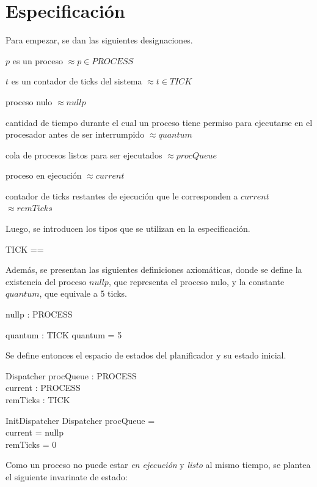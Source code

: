 \documentclass{article}
\newcommand{\desig}[2]{\item #1 $\approx #2$}
\newenvironment{designations}
  {\begin{leftbar}
    \begin{list}{}{\setlength{\labelsep}{0cm}
                   \setlength{\labelwidth}{0cm}
                   \setlength{\listparindent}{0cm}
                   \setlength{\rightmargin}{\leftmargin}}}
  {\end{list}\end{leftbar}}
\begin{document}
\section{Especificación}
Para empezar, se dan las siguientes designaciones.

\begin{designations}
\desig{$p$ es un proceso}{p \in PROCESS}
\desig{$t$ es un contador de ticks del sistema}{t \in TICK}
\desig{proceso nulo}{nullp}
\desig{cantidad de tiempo durante el cual un proceso tiene permiso para ejecutarse en el procesador antes de ser interrumpido}{quantum}
\desig{cola de procesos listos para ser ejecutados}{procQueue}
\desig{proceso en ejecución}{current}
\desig{contador de ticks restantes de ejecución que le corresponden a $current$}{remTicks}
\end{designations}

Luego, se introducen los tipos que se utilizan en la especificaci\'on. 

\begin{zed}
    [PROCESS]
\also
    TICK == \nat
\end{zed}

Adem\'as, se presentan las siguientes definiciones axiom\'aticas, donde se define la existencia del proceso $nullp$, que representa el proceso nulo, y la constante $quantum$, que equivale a 5 ticks.

\begin{axdef}
    nullp : PROCESS
\end{axdef}

\begin{axdef}
    quantum : TICK
\where
    quantum = 5
\end{axdef}

Se define entonces el espacio de estados del planificador y su estado inicial.

\begin{schema}{Dispatcher}
    procQueue : \seq \langle PROCESS \rangle \\
    current : PROCESS \\
    remTicks : TICK
\end{schema}

\begin{schema}{InitDispatcher}
    Dispatcher
\where
    procQueue = \langle \rangle \\
    current = nullp \\
    remTicks = 0
\end{schema}

Como un proceso no puede estar \textit{en ejecución} y \textit{listo} al mismo tiempo, se plantea el siguiente invarinate de estado:
\end{document}
